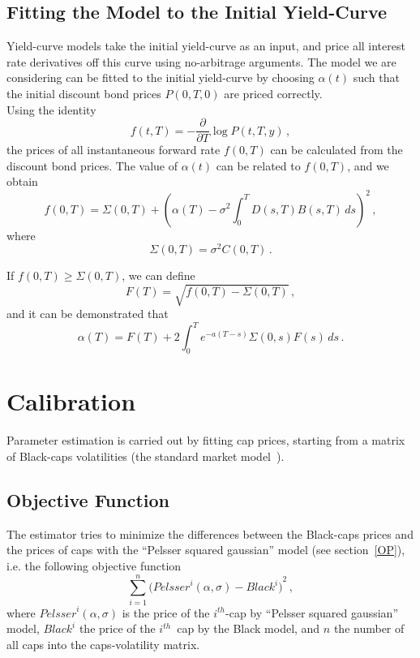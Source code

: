 \subsection{Fitting the Model to the Initial Yield-Curve}
Yield-curve models take the initial yield-curve as an input, and price all interest rate derivatives off this curve using no-arbitrage arguments. The model we are considering can be fitted to the initial yield-curve by choosing $\alpha(t)$ such that the initial discount bond prices $P(0,T,0)$ are priced correctly.\\
Using the identity
\begin{equation}
f(t,T)= - \dfrac{ \partial }{ \partial T } \log{P(t,T,y)} \, ,
\end{equation}
the prices of all instantaneous forward rate $f(0,T)$ can be calculated from the discount bond prices. The value of $\alpha(t)$ can be related to $f(0,T)$, and we obtain
\begin{equation}
f(0,T) = \Sigma(0,T) + {\left( \alpha(T) - \sigma^2 \int_0^T D(s,T) B(s,T) \, ds \right)}^2 \, ,
\end{equation}
where
$$ \Sigma(0,T) = \sigma^2 C(0,T) \, .$$


If $f(0,T) \geq \Sigma(0,T)$, we can define
\begin{equation}
F(T) = \sqrt{f(0,T) - \Sigma(0,T)} \, ,
\end{equation}
and it can be demonstrated that
\begin{equation}
\alpha(T) = F(T) + 2 \int_0^T e^{\displaystyle{-a(T-s)}} \Sigma(0,s) F(s) \, ds \, .
\end{equation}

\section{Calibration}

Parameter estimation is carried out by fitting cap prices, starting from a matrix of Black-caps volatilities (the standard market model~\cite{Hull:OptFutDer}).
\subsection{Objective Function}
The estimator tries to minimize the differences between the Black-caps prices and the prices of caps with the ``Pelsser squared gaussian'' model (see section~\ref{OP}), i.e. the following objective function
\begin{equation}
\displaystyle\sum_{i=1}^n {\Big( {{Pelsser}^i(\alpha,\sigma)} - {Black}^i \Big)}^2  \, ,
\end{equation}
where ${{Pelsser}^i(\alpha,\sigma)}$ is the price of the $i^{th}$-cap by ``Pelsser squared gaussian'' model, ${Black}^i$ the price of the $i^{th}$~cap by the Black model, and $n$ the number of all caps into the caps-volatility matrix.


